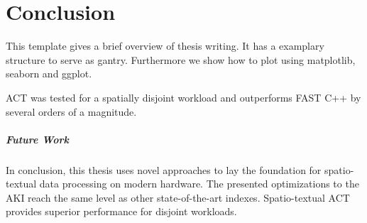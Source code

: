 \chapter{Conclusion}\label{c:c}

This template gives a brief overview of thesis writing. It has a examplary structure to serve as gantry.
Furthermore we show how to plot using matplotlib, seaborn and ggplot.

ACT was tested for a spatially disjoint workload and outperforms FAST C++ by several orders of a magnitude. 

\paragraph{Future Work}


In conclusion, this thesis uses novel approaches to lay the foundation for spatio-textual data processing on modern hardware. The presented optimizations to the AKI reach the same level as other state-of-the-art indexes. Spatio-textual ACT provides superior performance for disjoint workloads. 
